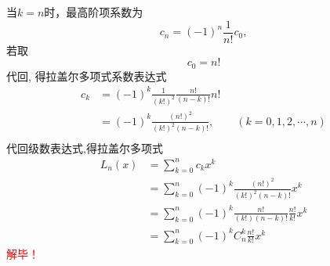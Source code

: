		当$k=n$时，最高阶项系数为
		\begin{equation*}
			c_{n}=(-1)^n \frac{1}{n!} c_0, 
		\end{equation*}	
		若取
		\begin{equation*}
			c_{0}=n!
		\end{equation*}	
		代回, 得拉盖尔多项式系数表达式
		\begin{equation*}
			\begin{aligned}
				c_{k}&= (-1)^k \frac{1}{(k!)^2}\frac{n! }{(n-k)!} n! \\
				&=(-1)^k \frac{(n!) ^2}{(k!)^2 (n-k)!},  \qquad (k=0,1,2,\cdots, n) \\ 
			\end{aligned}
		\end{equation*}	
		代回级数表达式,得拉盖尔多项式
		\begin{equation*}
		\begin{split}
			L_n(x) &=\sum_{k=0}^{n} c_{k} x^k \\
			&= \sum_{k=0}^{n} (-1)^k \frac{(n!)^2 }{(k!)^2 (n-k)!}x^k \\
			&= \sum_{k=0}^{n} (-1)^k \frac{n! }{(k!) (n-k)!} \frac{n!}{k!}x^k   \\
			&= \sum_{k=0}^{n} (-1)^k C^k _n \frac{n!}{k!}x^k
		\end{split}		
		\end{equation*}		
		\textcolor{red}{解毕！}
	
		~~\\ 
	
